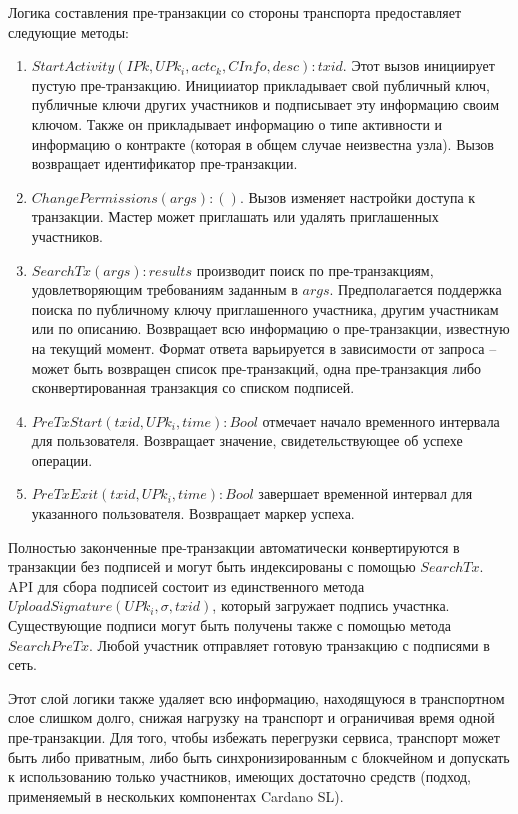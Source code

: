 \documentclass[]{itmo-student-thesis}
\begin{document}
Логика составления пре-транзакции со стороны транспорта предоставляет
следующие методы:
\begin{enumerate}
\item $StartActivity(IPk, {UPk_i}, actc_k, CInfo, desc) : txid$. Этот
  вызов инициирует пустую пре-транзакцию. Иницииатор прикладывает свой
  публичный ключ, публичные ключи других участников и подписывает эту
  информацию своим ключом. Также он прикладывает информацию о типе
  активности и информацию о контракте (которая в общем случае
  неизвестна узла). Вызов возвращает идентификатор пре-транзакции.
\item $ChangePermissions(args) : ()$. Вызов изменяет настройки
  доступа к транзакции. Мастер может приглашать или удалять
  приглашенных участников.
\item $SearchTx(args) : results$ производит поиск по пре-транзакциям,
  удовлетворяющим требованиям заданным в $args$. Предполагается
  поддержка поиска по публичному ключу приглашенного участника, другим
  участникам или по описанию.  Возвращает всю информацию о
  пре-транзакции, известную на текущий момент. Формат ответа
  варьируется в зависимости от запроса -- может быть возвращен список
  пре-транзакций, одна пре-транзакция либо сконвертированная
  транзакция со списком подписей.
\item $PreTxStart(txid, UPk_i, time) : Bool$ отмечает начало
  временного интервала для пользователя. Возвращает значение,
  свидетельствующее об успехе операции.
\item $PreTxExit(txid, UPk_i, time) : Bool$ завершает временной
  интервал для указанного пользователя. Возвращает маркер успеха.
\end{enumerate}

Полностью законченные пре-транзакции автоматически конвертируются в
транзакции без подписей и могут быть индексированы с помощью
$SearchTx$. API для сбора подписей состоит из единственного метода
$UploadSignature(UPk_i, \sigma, txid)$, который загружает подпись
участнка. Существующие подписи могут быть получены также с помощью
метода $SearchPreTx$. Любой участник отправляет готовую транзакцию с
подписями в сеть.

Этот слой логики также удаляет всю информацию, находящуюся в
транспортном слое слишком долго, снижая нагрузку на транспорт и
ограничивая время одной пре-транзакции. Для того, чтобы избежать
перегрузки сервиса, транспорт может быть либо приватным, либо быть
синхронизированным с блокчейном и допускать к использованию только
участников, имеющих достаточно средств (подход, применяемый в
нескольких компонентах Cardano SL).
\end{document}
